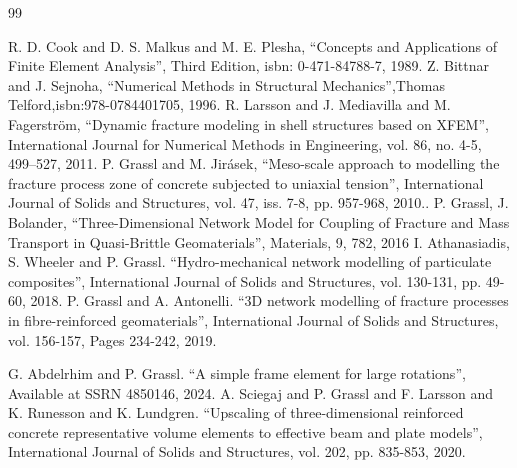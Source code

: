 \documentclass[a4paper]{article}
\begin{document}
\begin{thebibliography}{99}


 R. D. Cook and D. S. Malkus and M. E. Plesha, ``Concepts and Applications of Finite Element Analysis'', Third Edition, isbn: 0-471-84788-7, 1989.
 Z. Bittnar and J. Sejnoha, ``Numerical Methods in Structural Mechanics'',Thomas Telford,isbn:978-0784401705, 1996.
 R. Larsson and J. Mediavilla and M. Fagerström, ``Dynamic fracture modeling in shell structures based on XFEM'', International Journal for Numerical Methods in Engineering, vol. 86, no. 4-5, 499--527, 2011.
 P. Grassl and M. Jir\'{a}sek, ``Meso-scale approach to modelling the fracture process zone of concrete subjected to uniaxial tension'', International Journal of Solids and Structures, vol. 47, iss. 7-8, pp. 957-968, 2010..
 P. Grassl, J. Bolander, ``Three-Dimensional Network Model for Coupling of Fracture and Mass Transport in Quasi-Brittle Geomaterials'', Materials, 9, 782, 2016
 I. Athanasiadis, S. Wheeler and P. Grassl. ``Hydro-mechanical network modelling of particulate composites'', International Journal of Solids and Structures, vol. 130-131, pp. 49-60, 2018.
 P. Grassl and A. Antonelli. ``3D network modelling of fracture processes in fibre-reinforced geomaterials'', International Journal of Solids and Structures, vol. 156-157, Pages 234-242, 2019.

  
 G. Abdelrhim and P. Grassl. ``A simple frame element for large rotations'', Available at SSRN 4850146, 2024.
 A. Sciegaj and P. Grassl and F. Larsson and K. Runesson and K. Lundgren. ``Upscaling of three-dimensional reinforced concrete representative volume elements to effective beam and plate models'', International Journal of Solids and Structures, vol. 202, pp. 835-853, 2020.
\end{thebibliography}
\end{document}
